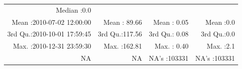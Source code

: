 \documentclass[
  10pt,
  a4paper,oneside]{article}
\begin{document}
\begin{longtable}[]{@{}rrrr@{}}
\begin{minipage}[t]{0.18\columnwidth}
Median :0.0\strut
\end{minipage}\tabularnewline
\begin{minipage}[t]{0.34\columnwidth}\raggedleft
Mean :2010-07-02 12:00:00\strut
\end{minipage} & \begin{minipage}[t]{0.19\columnwidth}\raggedleft
Mean : 89.66\strut
\end{minipage} & \begin{minipage}[t]{0.18\columnwidth}\raggedleft
Mean : 0.05\strut
\end{minipage} & \begin{minipage}[t]{0.18\columnwidth}\raggedleft
Mean :0.0\strut
\end{minipage}\tabularnewline
\begin{minipage}[t]{0.34\columnwidth}\raggedleft
3rd Qu.:2010-10-01 17:59:45\strut
\end{minipage} & \begin{minipage}[t]{0.19\columnwidth}\raggedleft
3rd Qu.:117.56\strut
\end{minipage} & \begin{minipage}[t]{0.18\columnwidth}\raggedleft
3rd Qu.: 0.08\strut
\end{minipage} & \begin{minipage}[t]{0.18\columnwidth}\raggedleft
3rd Qu.:0.0\strut
\end{minipage}\tabularnewline
\begin{minipage}[t]{0.34\columnwidth}\raggedleft
Max. :2010-12-31 23:59:30\strut
\end{minipage} & \begin{minipage}[t]{0.19\columnwidth}\raggedleft
Max. :162.81\strut
\end{minipage} & \begin{minipage}[t]{0.18\columnwidth}\raggedleft
Max. : 0.40\strut
\end{minipage} & \begin{minipage}[t]{0.18\columnwidth}\raggedleft
Max. :2.1\strut
\end{minipage}\tabularnewline
\begin{minipage}[t]{0.34\columnwidth}\raggedleft
NA\strut
\end{minipage} & \begin{minipage}[t]{0.19\columnwidth}\raggedleft
NA\strut
\end{minipage} & \begin{minipage}[t]{0.18\columnwidth}\raggedleft
NA's :103331\strut
\end{minipage} & \begin{minipage}[t]{0.18\columnwidth}\raggedleft
NA's :103331\strut
\end{minipage}\tabularnewline
\bottomrule
\end{longtable}
\end{document}
